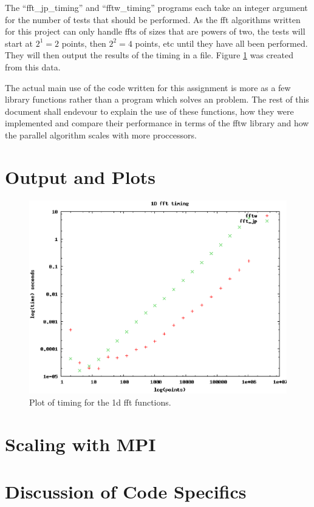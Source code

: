 \documentclass[12pt]{article}
\begin{document}
The ``fft\_jp\_timing'' and ``fftw\_timing'' programs each take an integer argument for the number of tests that should be performed. As the
fft algorithms written for this project can only handle ffts of sizes that are powers of two, the tests will start at $2^1 = 2$ points, then $2^2=4$ points, etc
until they have all been performed. They will then output the results of the timing in a file. Figure \ref{1d_time} was created from this data.

The actual main use of the code written for this assignment is more as a few library functions rather than a program which solves an problem.
The rest of this document shall endevour to explain the use of these functions, how they were implemented and compare their performance in terms
of the fftw library and how the parallel algorithm scales with more proccessors.

\section{Output and Plots}

\begin{figure}
\begin{center}
\includegraphics[scale=0.40]{figures/1d_timing.eps} \small \caption{Plot of timing for the 1d fft functions.\label{1d_time}}
\end{center}
\end{figure}


\section{Scaling with MPI}

\newpage

\section{Discussion of Code Specifics}
\end{document}
